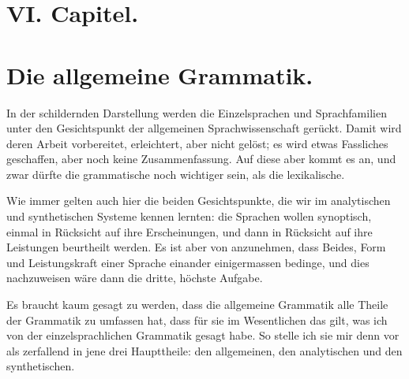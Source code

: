 \section*{VI. Capitel.}\label{IV.VI}
\section*{Die allgemeine Grammatik.}

\largerpage[1]In der schildernden Darstellung werden die Einzelsprachen und Sprachfamilien unter den Gesichtspunkt der allgemeinen Sprachwissenschaft gerückt. Damit wird deren Arbeit vorbereitet, erleichtert, aber nicht gelöst; es wird etwas Fassliches geschaffen, aber noch keine Zusammenfassung. Auf diese aber kommt es an, und zwar dürfte die grammatische noch wichtiger sein, als die lexikalische.

Wie immer gelten auch hier die beiden Gesichtspunkte, die wir im analytischen und synthetischen Systeme kennen lernten: die Sprachen wollen \label{fp.460} synoptisch, einmal in Rücksicht auf ihre Erscheinungen, und dann in Rücksicht auf ihre Leistungen beurtheilt werden. Es ist aber von  anzunehmen, dass Beides, Form und Leistungskraft einer Sprache einander einigermassen bedinge, und dies nachzuweisen wäre dann die dritte, höchste Aufgabe.

Es braucht kaum gesagt zu werden, dass die allgemeine Grammatik alle Theile der Grammatik zu umfassen hat, dass für sie im Wesentlichen das gilt, was ich von der einzelsprachlichen Grammatik gesagt habe. So stelle ich sie mir denn vor als zerfallend in jene drei Haupttheile: den allgemeinen, den analytischen und den synthetischen.

